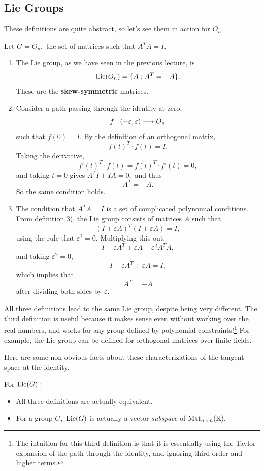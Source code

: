 \subsection{Lie Groups}
These definitions are quite abstract, so let's see them in action for $O_n.$ 
\begin{example}
Let $G = O_n,$ the set of matrices such that $A^TA = I.$
\end{example}
\begin{enumerate}
    \item The Lie group, as we have seen in the previous lecture, is \[\operatorname{Lie}(O_n) = \{A: A^T = -A\}.\] These are the \textbf{skew-symmetric} matrices.
    \item Consider a path passing through the identity at zero: \[f: (-\varepsilon, \varepsilon) \longrightarrow O_n\] such that $f(0) = I.$ By the definition of an orthogonal matrix, \[f(t)^T\cdot f(t) = I.\] Taking the derivative, \[f'(t)^T \cdot f(t) = f(t)^T \cdot f'(t) = 0,\] and taking $t = 0$ gives $A^TI + IA = 0,$ and thus \[A^T = -A.\] So the same condition holds.
    \item The condition that $A^TA = I$ is a set of complicated polynomial conditions. From definition 3), the Lie group consists of matrices $A$ such that \[(I + \varepsilon A)^T(I + \varepsilon A) = I,\] using the rule that $\varepsilon^2 = 0.$ Multiplying this out, \[I + \varepsilon A^T + \varepsilon A + \varepsilon^2 A^TA,\] and taking $\varepsilon^2 = 0,$ \[I + \varepsilon A^T + \varepsilon A = I,\] which implies that \[A^T = -A\] after dividing both sides by $\varepsilon.$
\end{enumerate}

All three definitions lead to the same Lie group, despite being very different. The third definition is useful because it makes sense even without working over the real numbers, and works for any group defined by polynomial constraints!\footnote{The intuition for this third definition is that it is essentially using the Taylor expansion of the path through the identity, and ignoring third order and higher terms.} For example, the Lie group can be defined for orthogonal matrices over finite fields.

Here are some non-obvious facts about these characterizations of the tangent space at the identity. 
\begin{proposition}
For $\operatorname{Lie}(G):$
\begin{itemize}
    \item All three definitions are actually equivalent.
    \item For a group $G,$ $\operatorname{Lie}(G)$ is actually a vector \emph{subspace} of $\text{Mat}_{n \hspace{0.05em}{\times}\hspace{0.05em} n}(\mathbb R).$
\end{itemize}
\end{proposition}

